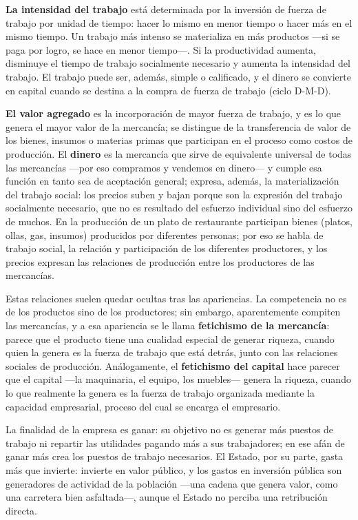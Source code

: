 \documentclass[
  man,
  floatsintext,
  longtable,
  a4paper,
  nolmodern,
  notxfonts,
  notimes,
  12pt,
  colorlinks=true,linkcolor=blue,citecolor=blue,urlcolor=blue]{apa7}
\begin{document}
\textbf{La intensidad del trabajo} está determinada por la inversión de
fuerza de trabajo por unidad de tiempo: hacer lo mismo en menor tiempo o
hacer más en el mismo tiempo. Un trabajo más intenso se materializa en
más productos ---si se paga por logro, se hace en menor tiempo---. Si la
productividad aumenta, disminuye el tiempo de trabajo socialmente
necesario y aumenta la intensidad del trabajo. El trabajo puede ser,
además, simple o calificado, y el dinero se convierte en capital cuando
se destina a la compra de fuerza de trabajo (ciclo D-M-D).

\textbf{El valor agregado} es la incorporación de mayor fuerza de
trabajo, y es lo que genera el mayor valor de la mercancía; se distingue
de la transferencia de valor de los bienes, insumos o materias primas
que participan en el proceso como costos de producción. El
\textbf{dinero} es la mercancía que sirve de equivalente universal de
todas las mercancías ---por eso compramos y vendemos en dinero--- y
cumple esa función en tanto sea de aceptación general; expresa, además,
la materialización del trabajo social: los precios suben y bajan porque
son la expresión del trabajo socialmente necesario, que no es resultado
del esfuerzo individual sino del esfuerzo de muchos. En la producción de
un plato de restaurante participan bienes (platos, ollas, gas, insumos)
producidos por diferentes personas; por eso se habla de trabajo social,
la relación y participación de los diferentes productores, y los precios
expresan las relaciones de producción entre los productores de las
mercancías.

Estas relaciones suelen quedar ocultas tras las apariencias. La
competencia no es de los productos sino de los productores; sin embargo,
aparentemente compiten las mercancías, y a esa apariencia se le llama
\textbf{fetichismo de la mercancía}: parece que el producto tiene una
cualidad especial de generar riqueza, cuando quien la genera es la
fuerza de trabajo que está detrás, junto con las relaciones sociales de
producción. Análogamente, el \textbf{fetichismo del capital} hace
parecer que el capital ---la maquinaria, el equipo, los muebles---
genera la riqueza, cuando lo que realmente la genera es la fuerza de
trabajo organizada mediante la capacidad empresarial, proceso del cual
se encarga el empresario.

La finalidad de la empresa es ganar: su objetivo no es generar más
puestos de trabajo ni repartir las utilidades pagando más a sus
trabajadores; en ese afán de ganar más crea los puestos de trabajo
necesarios. El Estado, por su parte, gasta más que invierte: invierte en
valor público, y los gastos en inversión pública son generadores de
actividad de la población ---una cadena que genera valor, como una
carretera bien asfaltada---, aunque el Estado no perciba una retribución
directa.
\end{document}
